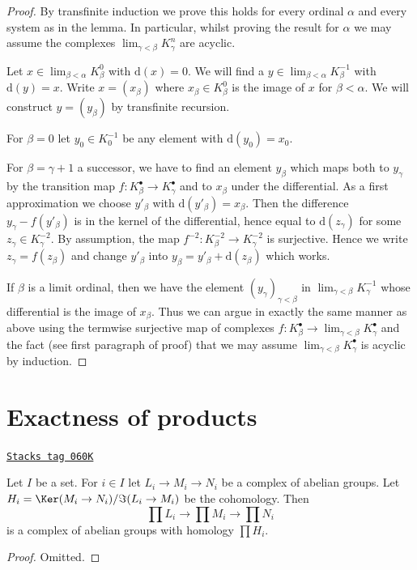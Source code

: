 \begin{proof}
By transfinite induction we prove this holds for every ordinal
$\alpha$ and every system as in the lemma. In particular, whilst
proving the result for $\alpha$ we may assume the complexes
$\lim_{\gamma < \beta} K^n_\gamma$ are acyclic.

\medskip\noindent
Let $x \in \lim_{\beta < \alpha} K^0_\beta$ with $\text{d}(x) = 0$.
We will find a $y \in \lim_{\beta < \alpha} K^{-1}_\beta$
with $\text{d}(y) = x$.
Write $x = (x_\beta)$ where $x_\beta \in K_\beta^0$ is the
image of $x$ for $\beta < \alpha$. We will construct $y = (y_\beta)$
by transfinite recursion.

\medskip\noindent
For $\beta = 0$ let $y_0 \in K_0^{-1}$
be any element with $\text{d}(y_0) = x_0$.

\medskip\noindent
For $\beta = \gamma + 1$ a successor, we have to find an element $y_\beta$
which maps both to $y_\gamma$ by the transition map
$f : K^\bullet_\beta \to K^\bullet_\gamma$ and to $x_\beta$ under the
differential. As a first approximation we choose $y'_\beta$ with
$\text{d}(y'_\beta) = x_\beta$. Then the difference $y_\gamma - f(y'_\beta)$
is in the kernel of the differential, hence equal to $\text{d}(z_\gamma)$
for some $z_\gamma \in K^{-2}_\gamma$.
By assumption, the map $f^{-2} : K^{-2}_\beta \to K^{-2}_\gamma$
is surjective. Hence we write $z_\gamma = f(z_\beta)$
and change $y'_\beta$ into $y_\beta = y'_\beta + \text{d}(z_\beta)$
which works.

\medskip\noindent
If $\beta$ is a limit ordinal, then we have the element
$(y_\gamma)_{\gamma < \beta}$ in $\lim_{\gamma < \beta} K^{-1}_\gamma$
whose differential is the image of $x_\beta$. Thus we can argue in exactly
the same manner as above using the termwise surjective map of complexes
$f : K_\beta^\bullet \to \lim_{\gamma < \beta} K_\gamma^\bullet$
and the fact (see first paragraph of proof) that we may assume
$\lim_{\gamma < \beta} K_\gamma^\bullet$ is acyclic by induction.
\end{proof}

\section{Exactness of products}
\label{homology-section-product-exact}
\begin{lemma}
\label{homology-lemma-product-abelian-groups-exact}
\href{https://stacks.math.columbia.edu/tag/060K}{\texttt{Stacks tag 060K}}

Let $I$ be a set. For $i \in I$ let $L_i \to M_i \to N_i$ be a complex
of abelian groups. Let $H_i = \Ker(M_i \to N_i)/\Im(L_i \to M_i)$
be the cohomology. Then
$$
\prod L_i \to \prod M_i \to \prod N_i
$$
is a complex of abelian groups with homology $\prod H_i$.
\end{lemma}

\begin{proof}
Omitted.
\end{proof}



